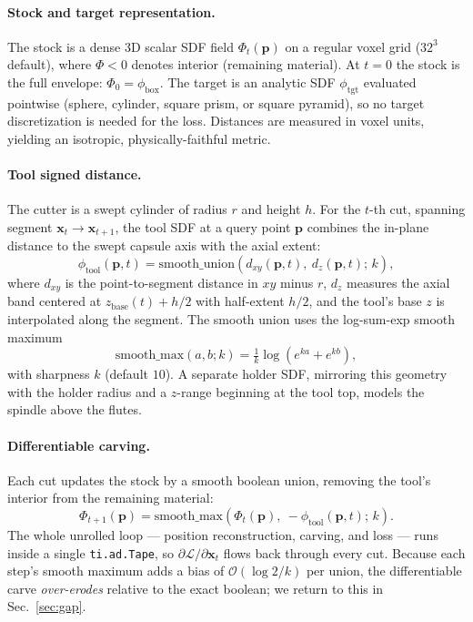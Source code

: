 \paragraph{Stock and target representation.}
The stock is a dense 3D scalar SDF field $\Phi_t(\mathbf{p})$ on a regular voxel
grid ($32^3$ default), where $\Phi<0$ denotes interior (remaining material). At
$t=0$ the stock is the full envelope: $\Phi_0 = \phi_{\mathrm{box}}$. The target
is an analytic SDF $\phi_{\mathrm{tgt}}$ evaluated pointwise (sphere, cylinder,
square prism, or square pyramid), so no target discretization is needed for the
loss. Distances are measured in voxel units, yielding an isotropic,
physically-faithful metric.

\paragraph{Tool signed distance.}
The cutter is a swept cylinder of radius $r$ and height $h$. For the $t$-th cut,
spanning segment $\mathbf{x}_t \!\to\! \mathbf{x}_{t+1}$, the tool SDF at a query
point $\mathbf{p}$ combines the in-plane distance to the swept capsule axis with
the axial extent:
\begin{equation}
  \phi_{\mathrm{tool}}(\mathbf{p}, t) = \mathrm{smooth\_union}\!\left(d_{xy}(\mathbf{p}, t),\ d_z(\mathbf{p}, t);\, k\right),
\end{equation}
where $d_{xy}$ is the point-to-segment distance in $xy$ minus $r$, $d_z$ measures
the axial band centered at $z_{\mathrm{base}}(t) + h/2$ with half-extent $h/2$,
and the tool's base $z$ is interpolated along the segment. The smooth union uses
the log-sum-exp smooth maximum
\begin{equation}
  \mathrm{smooth\_max}(a,b;k) = \tfrac{1}{k}\log\!\left(e^{ka} + e^{kb}\right),
\end{equation}
with sharpness $k$ (default $10$). A separate holder SDF, mirroring this geometry
with the holder radius and a $z$-range beginning at the tool top, models the
spindle above the flutes.

\paragraph{Differentiable carving.}
Each cut updates the stock by a smooth boolean union, removing the tool's
interior from the remaining material:
\begin{equation}
  \label{eq:soft-carve}
  \Phi_{t+1}(\mathbf{p}) = \mathrm{smooth\_max}\!\left(\Phi_t(\mathbf{p}),\ -\phi_{\mathrm{tool}}(\mathbf{p}, t);\, k\right).
\end{equation}
The whole unrolled loop --- position reconstruction, carving, and loss --- runs
inside a single \texttt{ti.ad.Tape}, so $\partial \mathcal{L}/\partial \mathbf{x}_t$
flows back through every cut. Because each step's smooth maximum adds a bias of
$\mathcal{O}(\log 2 / k)$ per union, the differentiable carve
\emph{over-erodes} relative to the exact boolean; we return to this in
Sec.~\ref{sec:gap}.

